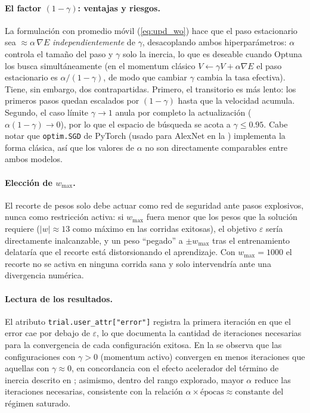 \documentclass[11pt,a4paper]{article}
\begin{document}
\paragraph{El factor $(1-\gamma)$: ventajas y riesgos.}
La formulación con promedio móvil (\cref{eq:upd_wo}) hace que el paso
estacionario sea $\approx\alpha\,\nabla E$ \emph{independientemente} de
$\gamma$, desacoplando ambos hiperparámetros: $\alpha$ controla el tamaño del
paso y $\gamma$ solo la inercia, lo que es deseable cuando Optuna los busca
simultáneamente (en el momentum clásico $V\leftarrow\gamma V+\alpha\nabla E$ el
paso estacionario es $\alpha/(1-\gamma)$, de modo que cambiar $\gamma$ cambia
la tasa efectiva). Tiene, sin embargo, dos contrapartidas. Primero, el
transitorio es más lento: los primeros pasos quedan escalados por $(1-\gamma)$
hasta que la velocidad acumula. Segundo, el caso límite $\gamma\to 1$ anula por
completo la actualización ($\alpha(1-\gamma)\to 0$), por lo que el espacio de
búsqueda se acota a $\gamma\le 0.95$. Cabe notar que \texttt{optim.SGD} de
PyTorch (usado para AlexNet en la ) implementa la forma
clásica, así que los valores de $\alpha$ no son directamente comparables entre
ambos modelos.

\paragraph{Elección de $w_{\max}$.}
El recorte de pesos solo debe actuar como red de seguridad ante pasos
explosivos, nunca como restricción activa: si $w_{\max}$ fuera menor que los
pesos que la solución requiere ($|w|\approx 13$ como máximo en las corridas
exitosas), el objetivo $\varepsilon$ sería directamente inalcanzable, y un peso
``pegado'' a $\pm w_{\max}$ tras el entrenamiento delataría que el recorte está
distorsionando el aprendizaje. Con $w_{\max}=1000$ el recorte no se activa en
ninguna corrida sana y solo intervendría ante una divergencia numérica.

\paragraph{Lectura de los resultados.}
El atributo \texttt{trial.user\_attr["error"]} registra la primera iteración en
que el error cae por debajo de $\varepsilon$, lo que documenta la cantidad de
iteraciones necesarias para la convergencia de cada configuración exitosa. En
la  se observa que las configuraciones con $\gamma>0$
(momentum activo) convergen en menos iteraciones que aquellas con
$\gamma\approx 0$, en concordancia con el efecto acelerador del término de
inercia descrito en ; asimismo, dentro del rango explorado,
mayor $\alpha$ reduce las iteraciones necesarias, consistente con la relación
$\alpha\times\text{épocas}\approx\text{constante}$ del régimen saturado.
\end{document}
